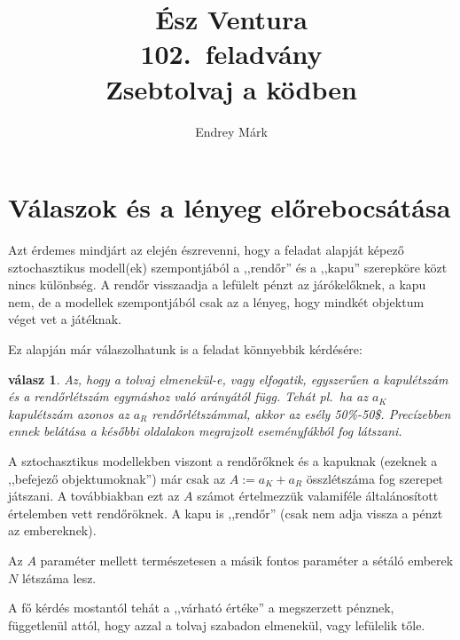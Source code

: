 \documentclass{article}
\author{Endrey Márk}
\title{Ész Ventura\\102.~feladvány\\Zsebtolvaj a ködben}
\newtheorem{answer}{válasz}
\begin{document}
	\maketitle

	\tableofcontents

	\section{Válaszok és a lényeg előrebocsátása}

	Azt érdemes mindjárt az elején észrevenni, hogy a feladat alapját képező sztochasztikus modell(ek) szempontjából a ,,rendőr'' és a ,,kapu'' szerepköre közt nincs különbség.
	A rendőr visszaadja a lefülelt pénzt az járókelőknek, a kapu nem, de a modellek szempontjából csak az  a lényeg, hogy mindkét objektum véget vet a játéknak.

	Ez alapján már válaszolhatunk is a feladat könnyebbik kérdésére:

	\begin{answer}
		Az, hogy a tolvaj elmenekül-e, vagy elfogatik, egyszerűen a kapu\-létszám és a rendőr\-létszám egymáshoz való arányától függ.
		Tehát pl.~ha az $a_K$ kapulétszám azonos az $a_R$ rendőrlétszámmal, akkor az esély 50\%-50\$.
		Precízebben ennek belátása a későbbi oldalakon megrajzolt \emph{eseményfákból} fog látszani.
	\end{answer}

	A sztochasztikus modellekben viszont a rendőrőknek és a kapuknak (ezeknek a ,,befejező objektumoknak'') már csak az $A := a_K + a_R$ összlétszáma fog szerepet játszani.
	A továbbiakban ezt az $A$ számot értelmezzük valamiféle általánosított értelemben vett rendőröknek. A kapu is ,,rendőr'' (csak nem adja vissza a pénzt az embereknek).

	Az $A$ paraméter mellett természetesen a másik fontos paraméter a sétáló emberek $N$ létszáma lesz.

	A fő kérdés mostantól tehát a ,,várható értéke'' a megszerzett pénznek, függetlenül attól, hogy azzal a tolvaj szabadon elmenekül, vagy lefülelik tőle.
\end{document}
